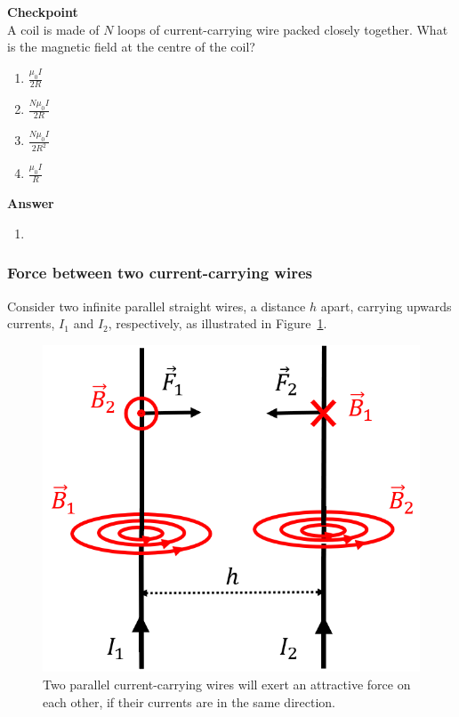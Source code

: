 \begin{framed}
\textbf{Checkpoint}\\
A coil is made of $N$ loops of current-carrying wire packed closely together. What is the magnetic field at the centre of the coil?

\begin{enumerate}
\item $\frac{\mu_0I}{2R}$
\item $\frac{N\mu_0I}{2R}$
\item $\frac{N\mu_0I}{2R^2}$
\item $\frac{\mu_0I}{R}$
\end{enumerate}

\begin{framed}
\textbf{Answer}\\
\begin{enumerate}[resume]
\item
\end{enumerate}
\end{framed}
\end{framed}

\subsubsection{Force between two current-carrying wires}

Consider two infinite parallel straight wires, a distance $h$ apart, carrying upwards currents, $I_1$ and $I_2$, respectively, as illustrated in Figure~\ref{fig:magneticsource:twowires}.

\begin{figure}[!htbp]
\centering
\includegraphics[width=0.4\linewidth]{files/twowires-c728efaf080baf12aff491b194a58f14.png}
\caption[]{Two parallel current-carrying wires will exert an attractive force on each other, if their currents are in the same direction.}
\label{fig:magneticsource:twowires}
\end{figure}

